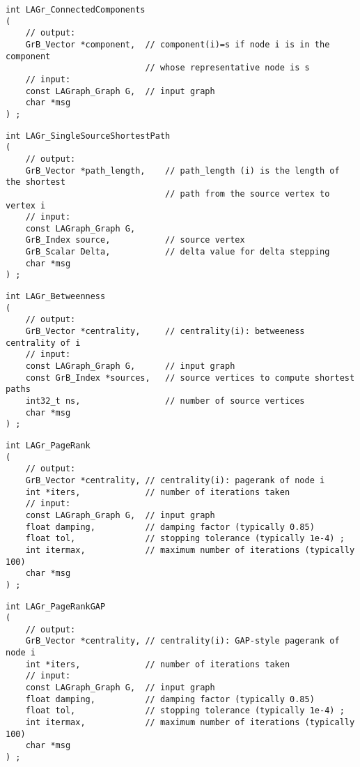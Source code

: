 \begin{verbatim}
int LAGr_ConnectedComponents
(
    // output:
    GrB_Vector *component,  // component(i)=s if node i is in the component
                            // whose representative node is s
    // input:
    const LAGraph_Graph G,  // input graph
    char *msg
) ;
\end{verbatim}




\begin{verbatim}
int LAGr_SingleSourceShortestPath
(
    // output:
    GrB_Vector *path_length,    // path_length (i) is the length of the shortest
                                // path from the source vertex to vertex i
    // input:
    const LAGraph_Graph G,
    GrB_Index source,           // source vertex
    GrB_Scalar Delta,           // delta value for delta stepping
    char *msg
) ;
\end{verbatim}




\begin{verbatim}
int LAGr_Betweenness
(
    // output:
    GrB_Vector *centrality,     // centrality(i): betweeness centrality of i
    // input:
    const LAGraph_Graph G,      // input graph
    const GrB_Index *sources,   // source vertices to compute shortest paths
    int32_t ns,                 // number of source vertices
    char *msg
) ;
\end{verbatim}




\begin{verbatim}
int LAGr_PageRank
(
    // output:
    GrB_Vector *centrality, // centrality(i): pagerank of node i
    int *iters,             // number of iterations taken
    // input:
    const LAGraph_Graph G,  // input graph
    float damping,          // damping factor (typically 0.85)
    float tol,              // stopping tolerance (typically 1e-4) ;
    int itermax,            // maximum number of iterations (typically 100)
    char *msg
) ;
\end{verbatim}




\begin{verbatim}
int LAGr_PageRankGAP
(
    // output:
    GrB_Vector *centrality, // centrality(i): GAP-style pagerank of node i
    int *iters,             // number of iterations taken
    // input:
    const LAGraph_Graph G,  // input graph
    float damping,          // damping factor (typically 0.85)
    float tol,              // stopping tolerance (typically 1e-4) ;
    int itermax,            // maximum number of iterations (typically 100)
    char *msg
) ;
\end{verbatim}




